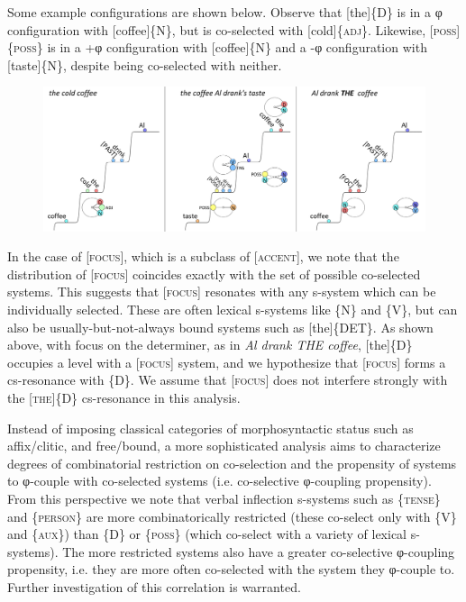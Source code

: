  Some example configurations are shown below. Observe that [the]\{\textsc{D}\} is in a φ configuration with [coffee]\{N\}, but is co-selected with [cold]\{\textsc{adj}\}. Likewise, [\textsc{poss}]\{\textsc{poss}\} is in a +φ configuration with [coffee]\{N\} and a -φ configuration with [taste]\{N\}, despite being co-selected with neither. 

  
\begin{figure}
\includegraphics[width=\textwidth]{figures/Tilsen-img68.png}
\caption{\missingcaption}
\label{fig:}
\end{figure}
 

  In the case of [\textsc{focus}], which is a subclass of [\textsc{accent}], we note that the distribution of [\textsc{focus}] coincides exactly with the set of possible co-selected systems. This suggests that [\textsc{focus}] resonates with any s-system which can be individually selected. These are often lexical s-systems like \{N\} and \{V\}, but can also be usually-but-not-always bound systems such as [the]\{DET\}. As shown above, with focus on the determiner, as in \textit{Al drank THE coffee}, [the]\{D\} occupies a level with a [\textsc{focus}] system, and we hypothesize that [\textsc{focus}] forms a cs-resonance with \{D\}. We assume that [\textsc{focus}] does not interfere strongly with the [\textsc{the}]\{D\} cs-resonance in this analysis.

  Instead of imposing classical categories of morphosyntactic status such as affix/clitic, and free/bound, a more sophisticated analysis aims to characterize degrees of combinatorial restriction on co-selection and the propensity of systems to φ-couple with co-selected systems (i.e. co-selective φ-coupling propensity). From this perspective we note that verbal inflection s-systems such as \{\textsc{tense}\} and \{\textsc{person}\} are more combinatorically restricted (these co-select only with \{V\} and \{\textsc{aux}\}) than \{D\} or \{\textsc{poss}\} (which co-select with a variety of lexical s-systems). The more restricted systems also have a greater co-selective φ-coupling propensity, i.e. they are more often co-selected with the system they φ-couple to. Further investigation of this correlation is warranted.

